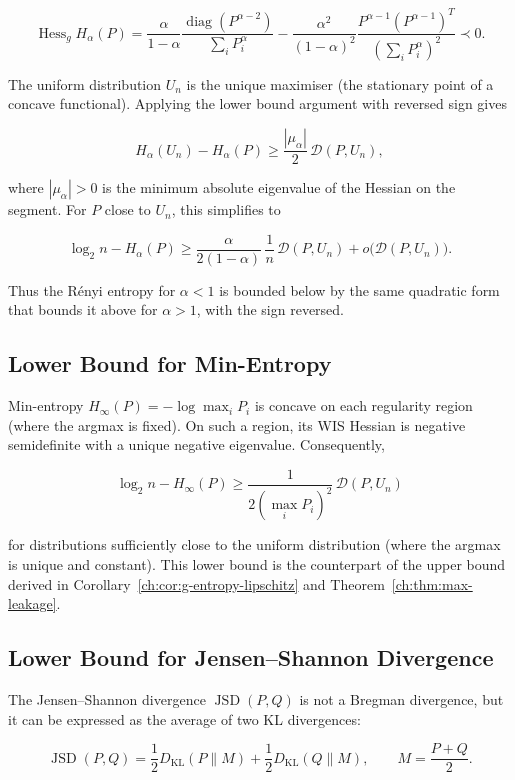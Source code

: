 \[
\operatorname{Hess}_g H_\alpha(P) = \frac{\alpha}{1-\alpha}
\frac{\operatorname{diag}(P^{\alpha-2})}{\sum_i P_i^\alpha}
- \frac{\alpha^2}{(1-\alpha)^2}
\frac{P^{\alpha-1}(P^{\alpha-1})^T}{(\sum_i P_i^\alpha)^2}
\prec 0.
\]

The uniform distribution $U_n$ is the unique maximiser (the
stationary point of a concave functional).  Applying the lower bound
argument with reversed sign gives

\[
H_\alpha(U_n) - H_\alpha(P) \ge \frac{|\mu_\alpha|}{2}\,
\mathcal D(P,U_n),
\]

where $|\mu_\alpha|>0$ is the minimum absolute eigenvalue of the
Hessian on the segment.  For $P$ close to $U_n$, this simplifies to

\[
\log_2 n - H_\alpha(P) \ge \frac{\alpha}{2(1-\alpha)}\,
\frac{1}{n}\,\mathcal D(P,U_n) + o\bigl(\mathcal D(P,U_n)\bigr).
\]

Thus the R\'enyi entropy for $\alpha<1$ is bounded below by the
same quadratic form that bounds it above for $\alpha>1$, with the
sign reversed.

\subsection{Lower Bound for Min-Entropy}\label{ch:sec:lower-bound-for-min-entropy}

Min-entropy $H_\infty(P)=-\log\max_i P_i$ is concave on each
regularity region (where the argmax is fixed).  On such a region,
its WIS Hessian is negative semidefinite with a unique negative
eigenvalue.  Consequently,

\[
\log_2 n - H_\infty(P) \ge \frac{1}{2(\max_i P_i)^2}\,
\mathcal D(P,U_n)
\]

for distributions sufficiently close to the uniform distribution
(where the argmax is unique and constant).  This lower bound is the
counterpart of the upper bound derived in
Corollary~\ref{ch:cor:g-entropy-lipschitz} and Theorem~\ref{ch:thm:max-leakage}.

\subsection{Lower Bound for Jensen--Shannon Divergence}\label{ch:sec:lower-bound-for-jensen--shannon-divergence}

The Jensen--Shannon divergence
$\operatorname{JSD}(P,Q)$ is not a Bregman divergence, but it can be
expressed as the average of two KL divergences:

\[
\operatorname{JSD}(P,Q)
= \frac12 D_{\mathrm{KL}}(P\|M) + \frac12 D_{\mathrm{KL}}(Q\|M),
\qquad M=\frac{P+Q}{2}.
\]

